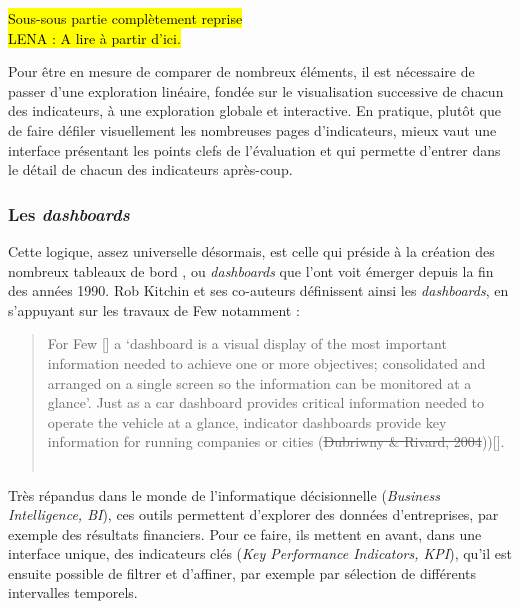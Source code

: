 	\begin{center}
		\hl{Sous-sous partie complètement reprise}\\
		\hl{LENA : A lire à partir d'ici.}
	\end{center}

	Pour être en mesure de comparer de nombreux éléments, il est nécessaire de passer d'une exploration linéaire, fondée sur le visualisation successive de chacun des indicateurs, à une exploration globale et interactive.
	En pratique, plutôt que de faire défiler visuellement les nombreuses pages d'indicateurs, mieux vaut une interface présentant les points clefs de l'évaluation et qui permette d'entrer dans le détail de chacun des indicateurs après-coup.

	\subsubsection{Les \textit{dashboards}}

	Cette logique, assez universelle désormais, est celle qui préside à la création des nombreux \og tableaux de bord \fg{}, ou \og \textit{dashboards} \fg{} que l'ont voit émerger depuis la fin des années 1990.
	Rob Kitchin et ses co-auteurs définissent ainsi les \textit{dashboards}, en s'appuyant sur les travaux de Few notamment :

	\begin{quotation}
		\og For Few [\autocite[p.34]{few_information_2006}] a ‘dashboard is
		a visual display of the most important information needed to achieve one or more objectives; consolidated and arranged on a single screen so the information can be monitored at a glance’.
		Just as a car dashboard provides critical information needed to operate the vehicle at a glance, indicator dashboards provide key information for running companies or cities (\st{Dubriwny \& Rivard, 2004}))[\autocite{rivard_are_2004}].\fg{}\\
		\mbox{}~ \hfill \cite[p. 11]{kitchin_knowing_2015}
	\end{quotation}

	Très répandus dans le monde de l'informatique décisionnelle (\textit{Business Intelligence, BI}), ces outils permettent d'explorer des données d'entreprises, par exemple des résultats financiers.
	Pour ce faire, ils mettent en avant, dans une interface unique, des indicateurs clés (\textit{Key Performance Indicators, KPI}), qu'il est ensuite possible de filtrer et d'affiner, par exemple par sélection de différents intervalles temporels.

